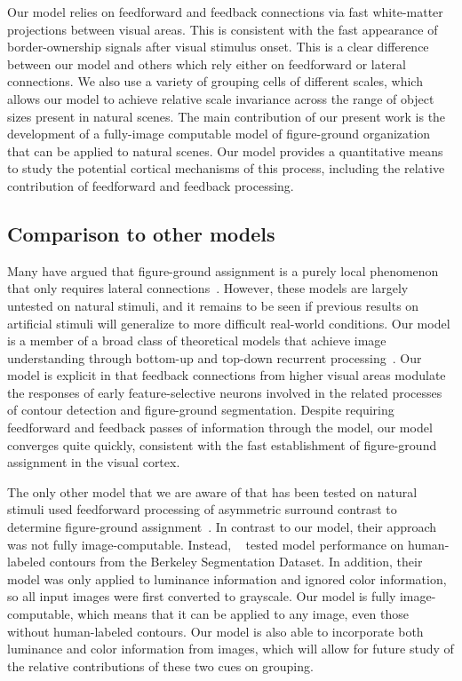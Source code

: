 Our model relies on feedforward and feedback connections via fast white-matter projections between visual areas. This is consistent with the fast appearance of border-ownership signals after visual stimulus onset. This is a clear difference between our model and others which rely either on feedforward or lateral connections. We also use a variety of grouping cells of different scales, which allows our model to achieve relative scale invariance across the range of object sizes present in natural scenes. The main contribution of our present work is the development of a fully-image computable model of figure-ground organization that can be applied to natural scenes. Our model provides a quantitative means to study the potential cortical mechanisms of this process, including the relative contribution of feedforward and feedback processing.

%
\subsection{Comparison to other models}
Many have argued that figure-ground assignment is a purely local phenomenon
that only requires lateral connections~\citep{Grossberg94, Grossberg97, Zhaoping05}. However, these models are largely untested on natural stimuli, and it remains to be seen if previous results on artificial stimuli will generalize to more difficult real-world conditions.
Our model is a member of a broad class of theoretical models that
achieve image understanding through bottom-up and top-down recurrent
processing~\citep{Ullman84,Hochstein_Ahissar02,Roelfsema_06,Epshtein_etal08}.
Our model is explicit in that feedback connections from higher visual areas
modulate the responses of early feature-selective neurons involved in
the related processes of contour detection and figure-ground
segmentation. Despite requiring feedforward and feedback passes of information through
the model, our model converges quite quickly, consistent with the fast establishment of figure-ground assignment in the visual cortex. 
%

The only other model that we are aware of that has been tested on natural stimuli used feedforward processing of asymmetric surround contrast to determine figure-ground assignment~\citep{Nishimura_Sakai05,Sakai_etal12}.
In contrast to our model, their approach was not fully image-computable. Instead, ~\citet{Sakai_etal12} tested model performance on human-labeled contours from the Berkeley Segmentation Dataset. In addition, their model was only applied to luminance information and ignored color information, so all input images were first converted to grayscale. Our model is fully image-computable, which  means that it can be applied to any image, even those without human-labeled contours. Our model is also able to incorporate both luminance and color information from images, which will allow for future study of the relative contributions of these two cues on grouping.

